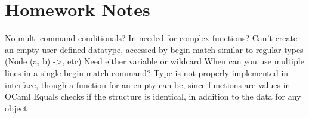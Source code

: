 \documentclass[11 pt, twoside]{article}
\newenvironment{outline*}
{
	\begin{outline}[enumerate]
	}
	{\end{outline}
}
\begin{document}
\section{Homework Notes}
\begin{outline*}
\1 No multi command conditionals?
\1 In needed for complex functions?
\1 Can't create an empty user-defined datatype, accessed by begin match similar to regular types (Node (a, b) ->, etc)
\1 Need either variable or wildcard
\1 When can you use multiple lines in a single begin match command?
\1 Type is not properly implemented in interface, though a function for an empty can be, since functions are values in OCaml
\1 Equals checks if the structure is identical, in addition to the data for any object
\end{outline*}
\end{document}
